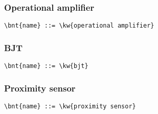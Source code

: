 \subsubsection{Operational amplifier}
\begin{Verbatim}[commandchars=\\\{\}]
    \bnt{name} ::= \kw{operational amplifier}
\end{Verbatim}

\subsubsection{BJT}
\begin{Verbatim}[commandchars=\\\{\}]
    \bnt{name} ::= \kw{bjt}
\end{Verbatim}

\subsubsection{Proximity sensor}
\begin{Verbatim}[commandchars=\\\{\}]
    \bnt{name} ::= \kw{proximity sensor}
\end{Verbatim}



